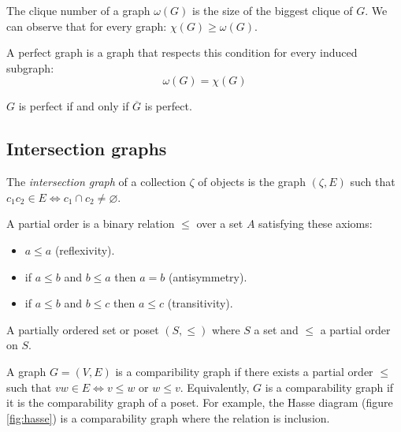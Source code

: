 \begin{defn}
  The clique number of a graph $\omega(G)$ is the size of the biggest clique of $G$. We
  can observe that for every graph: $\chi(G) \geq \omega(G)$.
\end{defn}

\begin{defn}
  A perfect graph is a graph that respects this condition for every induced subgraph:
  $$ \omega(G) = \chi(G)$$
\end{defn}

\begin{theorem}[Lovasz]
  $G$ is perfect if and only if $\overline{G}$ is perfect.
\end{theorem}

\subsection{Intersection graphs}

\begin{defn}
The \textit{intersection graph} of a collection $\zeta$ of objects is the graph
$(\zeta,E)$ such that $c_1c_2\in E \Leftrightarrow c_1 \cap c_2 \neq \varnothing$.
\end{defn}


\begin{defn}
  A partial order is a binary relation $\leq$ over a set $A$ satisfying these axioms:
  \begin{itemize}
    \item $a \leq a$ (reflexivity).
    \item if $a \leq b$ and $b \leq a$ then $a = b$ (antisymmetry).
    \item if $a \leq b$ and $b \leq c$ then $a \leq c$ (transitivity).
  \end{itemize}
\end{defn}

\begin{defn}
   A partially ordered set or poset  $(S,\leq)$ where $S$ a set and $\leq$ a partial
   order on $S$.
\end{defn}

\begin{defn}
  A graph $G = (V,E)$ is a comparibility graph if there exists a partial order
  $\leq$ such that $vw \in E \Leftrightarrow v \leq w$ or $w \leq v$.
  Equivalently, $G$ is a comparability graph if it is the comparability graph of
  a poset. For example, the Hasse diagram (figure \ref{fig:hasse}) is a
  comparability graph where the relation is inclusion.
\end{defn}

